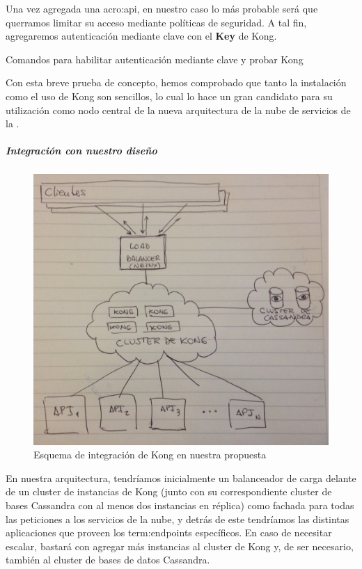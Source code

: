 Una vez agregada una \gls{acro:api}, en nuestro caso lo más probable será que querramos limitar su acceso mediante políticas de seguridad. A tal fin, agregaremos autenticación mediante clave con el  \textbf{Key} de Kong.

\begin{listing}[H]
  \caption{Comandos para habilitar autenticación mediante clave y probar Kong}
  \label{soa:tecnologias:kong:bash-habilitar-key-auth}
\end{listing}

Con esta breve prueba de concepto, hemos comprobado que tanto la instalación como el uso de Kong son sencillos, lo cual lo hace un gran candidato para su utilización como nodo central de la nueva arquitectura de la nube de servicios de la \unlp.

\subparagraph{Integración con nuestro diseño}

\begin{figure}
  \includegraphics[width=\linewidth]{src/images/03-capitulo-3/tecnologias/kong/kong-arq.jpg}
  \caption{Esquema de integración de Kong en nuestra propuesta}
  \label{fig:integracion-kong-arquitectura}
\end{figure}

En nuestra arquitectura, tendríamos inicialmente un balanceador de carga delante de un cluster de instancias de Kong (junto con su correspondiente cluster de bases Cassandra con al menos dos instancias en réplica) como fachada para todas las peticiones a los servicios de la nube, y detrás de este tendríamos las distintas aplicaciones que proveen los \glspl{term:endpoint} específicos. En caso de necesitar escalar, bastará con agregar más instancias al cluster de Kong y, de ser necesario, también al cluster de bases de datos Cassandra.

